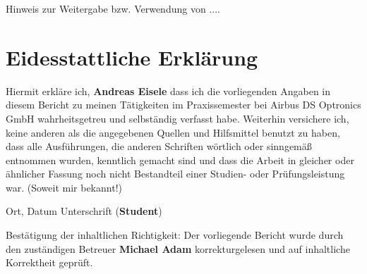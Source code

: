 \documentclass[12pt,a4paper]{scrreprt}
\begin{document}
\vspace{3cm}

\begin{minipage}{1\textwidth}

Hinweis zur Weitergabe bzw. Verwendung von ....

\end{minipage}



\newpage
\chapter{Eidesstattliche Erklärung}


\begin{minipage}{0.99\textwidth}

Hiermit erkläre ich, \textbf{Andreas Eisele}
dass ich die vorliegenden Angaben in diesem Bericht
zu meinen Tätigkeiten im Praxissemester bei
Airbus DS Optronics GmbH
wahrheitsgetreu und selbständig verfasst habe.
Weiterhin versichere ich, keine anderen als die angegebenen Quellen und Hilfsmittel benutzt zu haben, dass alle Ausführungen, die anderen Schriften wörtlich oder sinngemäß entnommen wurden, kenntlich gemacht sind und dass die Arbeit in gleicher oder ähnlicher Fassung noch nicht Bestandteil einer Studien- oder
Prüfungsleistung war. (Soweit mir bekannt!)

\vspace{2cm}

\end{minipage}

\begin{minipage}{0.99\textwidth}

Ort,  Datum \hspace{3cm} Unterschrift (\textbf{Student})

\end{minipage}


\vspace{3cm}

\begin{minipage}{0.99\textwidth}

Bestätigung der inhaltlichen Richtigkeit:
Der vorliegende Bericht wurde durch den zuständigen Betreuer
\textbf{Michael Adam} korrekturgelesen und auf inhaltliche Korrektheit geprüft.

\vspace{2cm}

\end{minipage}
\end{document}
